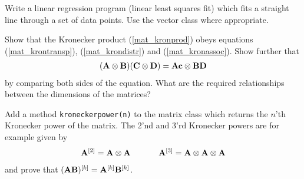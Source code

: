 \begin{exercises}

  \item Write a linear regression program (linear least squares fit)
          which fits a straight line through a set of data points.
          Use the vector class where appropriate.

  \item Show that the Kronecker product (\ref{mat_kronprod}) obeys 
          equations (\ref{mat_krontransp}), (\ref{mat_krondistr}) and
          (\ref{mat_kronassoc}). Show further that
          \begin{eqnarray}
            ({\bf A} \otimes {\bf B})({\bf C} \otimes {\bf D}) = {\bf Ac} \otimes {\bf BD}
          \end{eqnarray}
          by comparing both sides of the equation. What are the required
          relationships between the dimensions of the matrices?

  \item Add a method \verb+kroneckerpower(n)+ to the matrix class
          which returns the $n$'th Kronecker power of the matrix.
          The 2'nd and 3'rd Kronecker powers are for example given by
          \begin{eqnarray}
            {\bf A}^{[2]} = {\bf A} \otimes {\bf A} \hspace{12mm}
            {\bf A}^{[3]} = {\bf A} \otimes {\bf A} \otimes {\bf A}  
          \end{eqnarray}
          and prove that $({\bf AB})^{[k]} = {\bf A}^{[k]} {\bf B}^{[k]}$.
 
\end{exercises}
